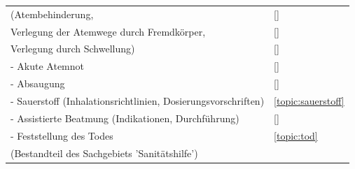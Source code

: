 \begin{xtabular}{p{10cm}p{5cm}}
(Atembehinderung, 
& 
\ref{}\noindent{}
\\
Verlegung der Atemwege  durch Fremdkörper, 
& 
\ref{}\noindent{}
\\
Verlegung durch Schwellung)
& 
\ref{}\noindent{}
\\
- Akute Atemnot
& 
\ref{}\noindent{}
\\
- Absaugung
& 
\ref{}\noindent{}
\\
- Sauerstoff (Inhalationsrichtlinien, Dosierungsvorschriften)
& 
\ref{topic:sauerstoff}
\\
- Assistierte Beatmung (Indikationen, Durchführung)
& 
\ref{}\noindent{}
\\
- Feststellung des Todes
& 
\ref{topic:tod}
\\\toprule
{}  

(Bestandteil des Sachgebiets 'Sanitätshilfe') 


\end{xtabular}
